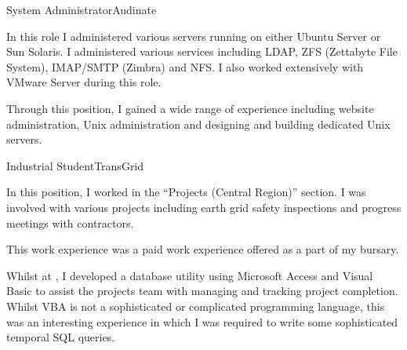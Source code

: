 \begin{professionalExperience}
{    %


}

{System Administrator}{Audinate}
{In this role I administered various servers running on either Ubuntu Server or
Sun Solaris. I administered various services including LDAP, ZFS (Zettabyte File
System), IMAP/SMTP (Zimbra) and NFS. I also worked extensively with VMware
Server during this role.

Through this position, I gained a wide range of experience including website
administration, Unix administration and designing and building dedicated Unix
servers.}
{






}

{Industrial Student}{TransGrid}
{In this position, I worked in the ``Projects (Central Region)'' section. I was
involved with various projects including earth grid safety inspections and
progress meetings with contractors.

This work experience was a paid work experience offered as a part of my
 bursary.

Whilst at , I developed a database utility using
Microsoft Access and Visual Basic to assist the projects team with managing and
tracking project completion. Whilst VBA is not a sophisticated or complicated
programming language, this was an interesting experience in which I was required
to write some sophisticated temporal SQL queries.}
{

}
\end{professionalExperience}

